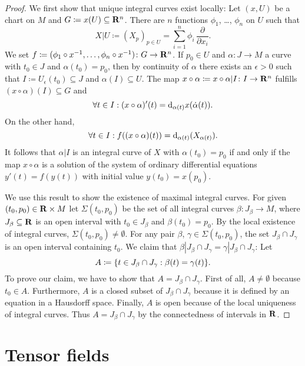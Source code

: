 \begin{proof}
  We first show that unique integral curves exist locally: Let $(x, U)$ be
  a chart on $M$ and $G \coloneqq x(U) \subseteq \mathbf{R}^n$. There are $n$
  functions $\phi_1$, \dots, $\phi_n$ on $U$ such that
  \[
    X|U \coloneqq (X_p)_{p \in U}
    = \sum_{i = 1}^n \phi_i \, \frac{\partial}{\partial x_i}.
  \]
  We set $f \coloneqq (\phi_1 \circ x^{-1}, \dotsc, \phi_n \circ x^{-1})
  \colon G \to \mathbf{R}^n$. If $p_0 \in U$ and $\alpha\colon J \to M$ a curve
  with $t_0 \in J$ and $\alpha(t_0) = p_0$, then by continuity of $\alpha$
  there exists an $\epsilon > 0$ such that
  $I \coloneqq U_\epsilon(t_0) \subseteq J$ and $\alpha(I) \subseteq U$. The
  map $x \circ \alpha \coloneqq x \circ \alpha|I\colon I \to \mathbf{R}^n$ fulfills
  $(x \circ \alpha)(I) \subseteq G$ and
  \[
    \forall t \in I : (x \circ \alpha)'(t) = \mathrm d_{\alpha(t)} x(\dot\alpha(t)).
  \]
  On the other hand,
  \[
    \forall t \in I: f((x \circ \alpha)(t)) = \mathrm d_{\alpha(t)}(X_{\alpha(t)}).
  \] 
  It follows that $\alpha|I$ is an integral curve of $X$ with $\alpha(t_0) = p_0$
  if and only if the map $x \circ \alpha$ is a solution of the system
  of ordinary differential equations
  $y'(t) = f(y(t))$ with initial value $y(t_0) = x(p_0)$.

  We use this result to show the existence of maximal integral curves. For given
  $(t_0, p_0) \in \mathbf{R} \times M$ let $\Sigma(t_0, p_0)$ be the set of all
  integral curves $\beta\colon J_\beta \to M$, where $J_\beta \subseteq \mathbf{R}$
  is an open interval with $t_0 \in J_\beta$ and $\beta(t_0) = p_0$.
  By the local existence of integral curves, $\Sigma(t_0, p_0) \neq \emptyset$.
  For any pair $\beta$, $\gamma \in \Sigma(t_0, p_0)$, the set $J_\beta \cap
  J_\gamma$ is an open interval containing $t_0$. We claim that $\beta|J_\beta
  \cap J_\gamma = \gamma|J_\beta \cap J_\gamma$: Let
  \[
    A \coloneqq \lbrace t \in J_\beta \cap J_\gamma : \beta(t) = \gamma(t)\rbrace.
  \]
  To prove our claim, we have to show that $A = J_\beta \cap J_\gamma$. First
  of all, $A \neq \emptyset$ because $t_0 \in A$. Furthermore, $A$ is a closed
  subset of $J_\beta \cap J_\gamma$ because it is defined by an equation in a
  Hausdorff space. Finally, $A$ is open because of the local uniqueness of
  integral curves. Thus $A = J_\beta \cap J_\gamma$ by the connectedness of
  intervals in $\mathbf{R}$.
\end{proof}



\section{Tensor fields}

